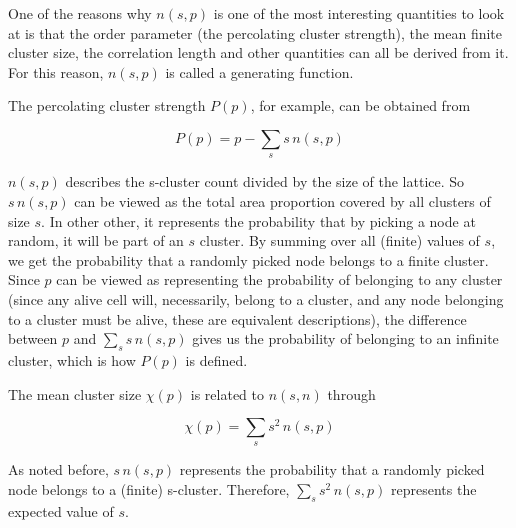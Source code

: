 One of the reasons why $n(s, p)$ is one of the most interesting quantities to look at is that the order parameter (the percolating cluster strength), the mean finite cluster size, the correlation length and other quantities can all be derived from it. For this reason, $n(s, p)$ is called a generating function.

The percolating cluster strength $P(p)$, for example, can be obtained from 

\begin{equation}
P(p) = p - \sum_s s\, n(s, p)
\end{equation}

$n(s, p)$ describes the s-cluster count divided by the size of the lattice. So $s\, n(s, p)$ can be viewed as the total area proportion covered by all clusters of size $s$. In other other, it represents the probability that by picking a node at random, it will be part of an $s$ cluster. By summing over all (finite) values of $s$, we get the probability that a randomly picked node belongs to a finite cluster. Since $p$ can be viewed as representing the probability of belonging to any cluster (since any
alive cell will, necessarily, belong to a cluster, and any node belonging to a cluster must be alive, these are equivalent descriptions), the difference between $p$ and $\sum_s s\, n(s, p)$ gives us the probability of belonging to an infinite cluster, which is how $P(p)$ is defined.


The mean cluster size $\chi(p)$ is related to $n(s, n)$ through 

\begin{equation}
    \chi(p) = \sum_s s^2\, n(s, p)
\end{equation}

As noted before, $s\, n(s, p)$ represents the probability that a randomly picked node belongs to a (finite) s-cluster. Therefore, $\sum_s s^2\, n(s, p)$ represents the expected value of $s$.  